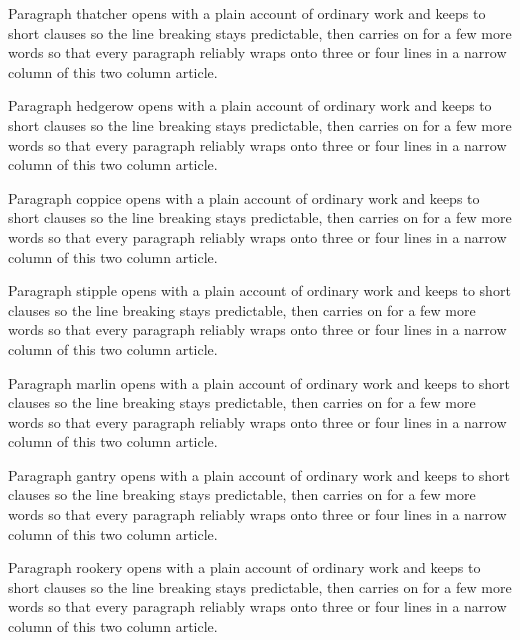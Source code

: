 \documentclass[twocolumn]{article}
\begin{document}
Paragraph thatcher opens with a plain account of ordinary work and keeps to short
clauses so the line breaking stays predictable, then carries on for a few more
words so that every paragraph reliably wraps onto three or four lines in a
narrow column of this two column article.

Paragraph hedgerow opens with a plain account of ordinary work and keeps to short
clauses so the line breaking stays predictable, then carries on for a few more
words so that every paragraph reliably wraps onto three or four lines in a
narrow column of this two column article.

Paragraph coppice opens with a plain account of ordinary work and keeps to short
clauses so the line breaking stays predictable, then carries on for a few more
words so that every paragraph reliably wraps onto three or four lines in a
narrow column of this two column article.

Paragraph stipple opens with a plain account of ordinary work and keeps to short
clauses so the line breaking stays predictable, then carries on for a few more
words so that every paragraph reliably wraps onto three or four lines in a
narrow column of this two column article.

Paragraph marlin opens with a plain account of ordinary work and keeps to short
clauses so the line breaking stays predictable, then carries on for a few more
words so that every paragraph reliably wraps onto three or four lines in a
narrow column of this two column article.

Paragraph gantry opens with a plain account of ordinary work and keeps to short
clauses so the line breaking stays predictable, then carries on for a few more
words so that every paragraph reliably wraps onto three or four lines in a
narrow column of this two column article.

Paragraph rookery opens with a plain account of ordinary work and keeps to short
clauses so the line breaking stays predictable, then carries on for a few more
words so that every paragraph reliably wraps onto three or four lines in a
narrow column of this two column article.
\end{document}
